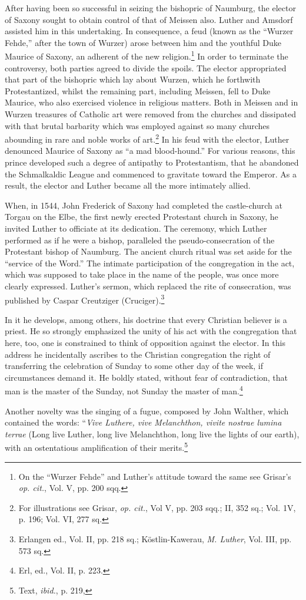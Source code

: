 After having been so successful in seizing the bishopric of Naumburg,
the elector of Saxony sought to obtain control of that of
Meissen also. Luther and Amsdorf assisted him in this undertaking.
In consequence, a feud (known as the “Wurzer Fehde,” after the
town of Wurzer) arose between him and the youthful Duke Maurice
of Saxony, an adherent of the new religion.\footnote
{On the “Wurzer Fehde” and Luther’s attitude toward the same see Grisar’s \textit{op. cit.},
Vol. V, pp. 200 sqq.}
In order to terminate
the controversy, both parties agreed to divide the spoils. The elector
appropriated that part of the bishopric which lay about Wurzen,
which he forthwith Protestantized, whilst the remaining part, including
Meissen, fell to Duke Maurice, who also exercised violence in religious
matters. Both in Meissen and in Wurzen treasures of Catholic
art were removed from the churches and dissipated with that brutal
barbarity which was employed against so many churches abounding
in rare and noble works of art.\footnote
{For illustrations see Grisar, \textit{op. cit.}, Vol V, pp. 203 sqq.; II, 352 sq.; Vol. 1V, p.
196; Vol. VI, 277 sq.}
In his feud with the elector, Luther
denounced Maurice of Saxony as ``a mad blood-hound.'' For various
reasons, this prince developed such a degree of antipathy to Protestantism,
that he abandoned the Schmalkaldic League and commenced
to gravitate toward the Emperor. As a result, the elector and Luther
became all the more intimately allied.

When, in 1544, John Frederick of Saxony had completed the
castle-church at Torgau on the Elbe, the first newly erected
Protestant church in Saxony, he invited Luther to officiate at its dedication.
The ceremony, which Luther performed as if he were a bishop, paralleled
the pseudo-consecration of the Protestant bishop of Naumburg.
The ancient church ritual was set aside for the “service of the Word.”
The intimate participation of the congregation in the act, which
was supposed to take place in the name of the people, was once
more clearly expressed. Luther’s sermon, which replaced the rite of
consecration, was published by Caspar Creutziger (Cruciger).\footnote
{Erlangen ed., Vol. II, pp. 218 sq.; Köstlin-Kawerau, \textit{M. Luther}, Vol. III, pp. 573 sq.}

In it he develops, among others, his doctrine that every Christian believer
is a priest. He so strongly emphasized the unity of his act with
the congregation that here, too, one is constrained to think of opposition
against the elector. In this address he incidentally ascribes
to the Christian congregation the right of transferring the celebration
of Sunday to some other day of the week, if circumstances
demand it. He boldly stated, without fear of contradiction, that
man is the master of the Sunday, not Sunday the master of man.\footnote{Erl, ed., Vol. II, p. 223.}

Another novelty was the singing of a fugue, composed by John Walther,
which contained the words: “\textit{Vive Luthere, vive Melanchthon, vivite
nostrae lumina terrae} (Long live Luther, long live Melanchthon, long
live the lights of our earth), with an ostentatious amplification of
their merits.\footnote{Text, \textit{ibid.}, p. 219,}
